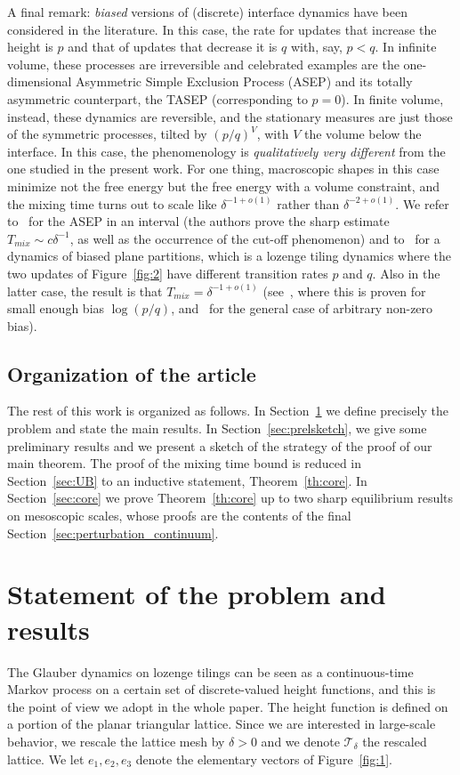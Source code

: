 \documentclass[10pt]{amsart}
\theoremstyle{definition}\newtheorem{defi}[theo]{Definition}\newtheorem{rema}[theo]{Remark}\newtheorem{exam}[theo]{Example}\newtheorem{exem}[theo]{Example}\newtheorem{nota}[theo]{Notation}
\newcommand{\clT}{\mathcal{T}}
\begin{document}
A final remark: \emph{biased} versions of (discrete) interface dynamics have been considered in the literature. In this case, the rate for updates that increase the height is $p$ and that of updates that decrease it is $q$ with, say, $p<q$. In infinite volume, these processes are irreversible and celebrated examples are the one-dimensional Asymmetric Simple Exclusion Process (ASEP) and its totally asymmetric counterpart, the TASEP (corresponding to $p=0$). In finite volume, instead, these dynamics are reversible, and the stationary measures are just those of the symmetric processes, tilted by $(p/q)^V$, with $V$ the volume below the interface. In this case, the phenomenology is \emph{qualitatively very different} from the one studied in the present work. For one thing, macroscopic shapes in this case minimize not the free energy but the free energy with a volume constraint, and the mixing time turns out to scale like $\delta^{-1+o(1)}$ rather than $\delta^{-2+o(1)}$. We refer to~\cite{LLabbe} for the ASEP in an interval (the authors prove the sharp estimate $T_{mix}\sim c \delta^{-1}$, as well as the occurrence of the cut-off phenomenon) and to~\cite{CMTRSA,GP} for a dynamics of biased plane partitions, which is a lozenge tiling dynamics where the two updates of Figure~\ref{fig:2} have different transition rates $p$ and $q$. Also in the latter case, the result is that $T_{mix}=\delta^{-1+o(1)}$ (see~\cite{GP}, where this is proven for small enough bias $\log(p/q)$, and~\cite{CMTRSA} for the general case of arbitrary non-zero bias).


\subsection*{Organization of the article}
The rest of this work is organized as follows. In Section~\ref{sec:results} we define precisely the problem and state the main results. In Section~\ref{sec:prelsketch}, we give some preliminary results and we present a sketch of the strategy of the proof of our main theorem. The proof of the mixing time bound is reduced in Section~\ref{sec:UB} to an inductive statement, Theorem~\ref{th:core}. In Section~\ref{sec:core} we prove Theorem~\ref{th:core} up to two sharp equilibrium results on mesoscopic scales, whose proofs are the contents of the final Section~\ref{sec:perturbation_continuum}.

\section{Statement of the problem and results}\label{sec:results}
The Glauber dynamics on lozenge tilings can be seen as a continuous-time Markov process on a certain set of discrete-valued height functions, and this is the point of view we adopt in the whole paper. The height function is defined on a portion of the planar triangular lattice. Since we are interested in large-scale behavior, we rescale the lattice mesh by $\delta>0$ and we denote $\clT_\delta$ the rescaled lattice. We let $e_1,e_2,e_3$ denote the elementary vectors of Figure~\ref{fig:1}.
\end{document}
